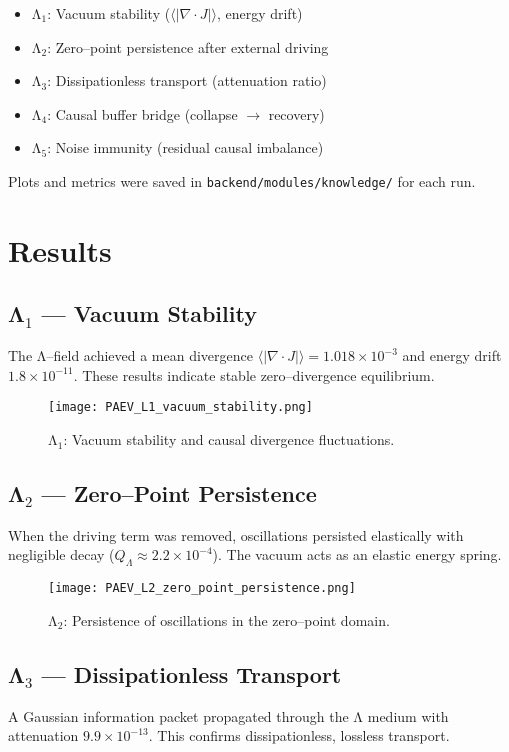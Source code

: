 \documentclass[12pt]{article}
\begin{document}
\begin{itemize}
  \item Λ$_1$: Vacuum stability ($\langle |\nabla\!\cdot\!J| \rangle$, energy drift)
  \item Λ$_2$: Zero--point persistence after external driving
  \item Λ$_3$: Dissipationless transport (attenuation ratio)
  \item Λ$_4$: Causal buffer bridge (collapse $\rightarrow$ recovery)
  \item Λ$_5$: Noise immunity (residual causal imbalance)
\end{itemize}

Plots and metrics were saved in \texttt{backend/modules/knowledge/} for each run.

\section{Results}

\subsection{Λ$_1$ --- Vacuum Stability}
The Λ--field achieved a mean divergence $\langle |\nabla\!\cdot\!J| \rangle = 1.018\times10^{-3}$ and energy drift $1.8\times10^{-11}$.
These results indicate stable zero--divergence equilibrium.

\begin{figure}[H]
\centering
\texttt{[image: PAEV\_L1\_vacuum\_stability.png]}
\caption{Λ$_1$: Vacuum stability and causal divergence fluctuations.}
\end{figure}

\subsection{Λ$_2$ --- Zero--Point Persistence}
When the driving term was removed, oscillations persisted elastically with negligible decay ($Q_\Lambda \approx 2.2\times10^{-4}$).
The vacuum acts as an elastic energy spring.

\begin{figure}[H]
\centering
\texttt{[image: PAEV\_L2\_zero\_point\_persistence.png]}
\caption{Λ$_2$: Persistence of oscillations in the zero--point domain.}
\end{figure}

\subsection{Λ$_3$ --- Dissipationless Transport}
A Gaussian information packet propagated through the Λ medium with attenuation $9.9\times10^{-13}$.
This confirms dissipationless, lossless transport.
\end{document}
